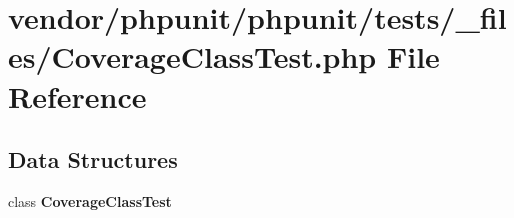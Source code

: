 \section{vendor/phpunit/phpunit/tests/\+\_\+files/\+Coverage\+Class\+Test.php File Reference}
\label{phpunit_2tests_2__files_2_coverage_class_test_8php}
\subsection*{Data Structures}
\begin{DoxyCompactItemize}
\item 
class {\bf Coverage\+Class\+Test}
\end{DoxyCompactItemize}
